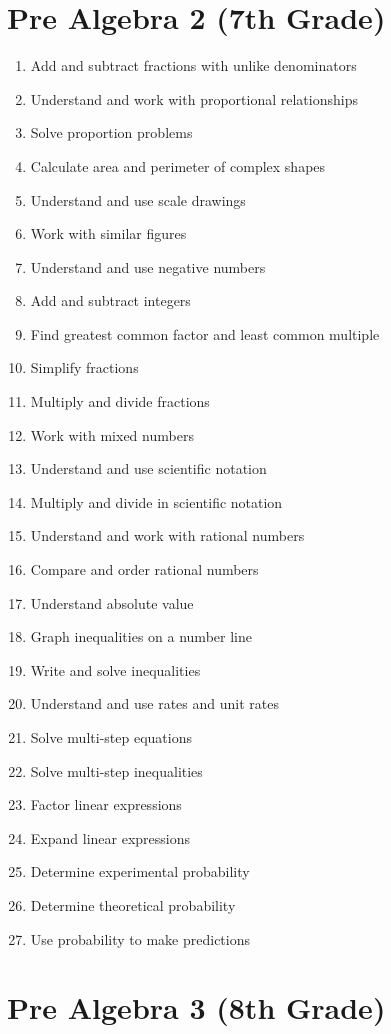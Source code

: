 \documentclass[11pt]{article}
\begin{document}
\section{Pre Algebra 2 (7th Grade)}

\begin{enumerate}
\item Add and subtract fractions with unlike denominators
\item Understand and work with proportional relationships
\item Solve proportion problems
\item Calculate area and perimeter of complex shapes
\item Understand and use scale drawings
\item Work with similar figures
\item Understand and use negative numbers
\item Add and subtract integers
\item Find greatest common factor and least common multiple
\item Simplify fractions
\item Multiply and divide fractions
\item Work with mixed numbers
\item Understand and use scientific notation
\item Multiply and divide in scientific notation
\item Understand and work with rational numbers
\item Compare and order rational numbers
\item Understand absolute value
\item Graph inequalities on a number line
\item Write and solve inequalities
\item Understand and use rates and unit rates
\item Solve multi-step equations
\item Solve multi-step inequalities
\item Factor linear expressions
\item Expand linear expressions
\item Determine experimental probability
\item Determine theoretical probability
\item Use probability to make predictions
\end{enumerate}

\section{Pre Algebra 3 (8th Grade)}
\end{document}
